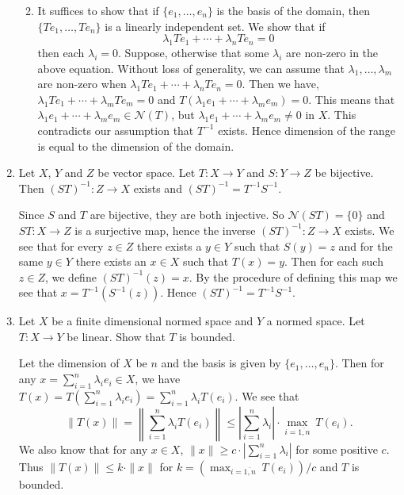 \documentclass[12pt]{article}
\newcommand{\cN}{\mathcal{N}}
\begin{document}
\begin{enumerate}
\begin{mybox}
\begin{enumerate}
        \vspace*{3mm}
        \item It suffices to show that if $\{e_1,\ldots
        ,e_n\}$ is the basis of the domain, then $\{Te_1,
        \ldots, Te_n\}$ is a linearly independent set.
        We show that if
        $$\lambda_1Te_1+\cdots+\lambda_nTe_n=0$$
        then each $\lambda_i=0$. Suppose, otherwise that
        some $\lambda_i$ are non-zero in the above equation.
        Without loss of generality, we can assume that
        $\lambda_1,\ldots,\lambda_m$ are non-zero
        when $\lambda_1Te_1+\cdots+\lambda_nTe_n=0$.
        Then we have, $\lambda_1Te_1+\cdots+\lambda_mTe_m=0$
        and $T(\lambda_1e_1+\cdots+\lambda_me_m)=0$.
        This means that $\lambda_1e_1+\cdots+\lambda_me_m
        \in \cN(T)$, but $\lambda_1e_1+\cdots+\lambda_me_m
        \neq 0$ in $X$. This contradicts our assumption that
        $T^{-1}$ exists. Hence dimension of the range is
        equal to the dimension of the domain.
    \end{enumerate}
\end{mybox}


\item Let $X$, $Y$ and $Z$ be vector space.
    Let $T: X \to Y$ and
    $S: Y \to Z$ be bijective. Then $(ST)^{-1}: Z \to X $
    exists and $(ST)^{-1} = T^{-1} S^{-1}$. 
\begin{mybox}

    Since $S$ and $T$ are bijective, they are both injective.
    So $\cN(ST)=\{0\}$ and $ST:X\to Z$ is a surjective map,
    hence the inverse $(ST)^{-1}:Z\to X$ exists.
    We see that for every
    $z\in Z$ there exists a $y\in Y$ such that $S(y)=z$
    and for the same $y\in Y$ there exists an $x\in X$
    such that $T(x)=y$. Then for each such $z\in Z$,
    we define $(ST)^{-1}(z)=x$. By the procedure of
    defining this map we see that $x=T^{-1}(S^{-1}(z))$.
    Hence $(ST)^{-1}=T^{-1}S^{-1}$.
\end{mybox}
 
 
\item Let $X$ be a finite dimensional normed space and
    $Y$ a normed space.
    Let $T: X \to Y$ be linear. Show that $T$ is bounded. 
\begin{mybox}

    Let the dimension of $X$ be $n$ and the basis is
    given by $\{e_1,\ldots,e_n\}$. Then for any $x=
    \sum_{i=1}^n{\lambda_ie_i}\in X$,
    we have $T(x)=T\left(\sum_{i=1}^n{\lambda_ie_i}\right)
    =\sum_{i=1}^n{\lambda_iT(e_i)}.$ We see that
    $$\left\|T(x)\right\|=\left\|\sum_{i=1}^n{\lambda_iT(e_i)}
    \right\|\leq \left|\sum_{i=1}^n{\lambda_i}\right|\cdot
    \max_{i=\overline{1,n}}\ T(e_i).$$
    We also know that for any $x\in X$, $\|x\|\geq c
    \cdot \left|\sum_{i=1}^n{\lambda_i}\right|$ for some
    positive $c$. Thus $\|T(x)\|\leq k\cdot\|x\|$ for
    $k=(\max_{i=\overline{1,n}}\ T(e_i))/c$ and $T$ is
    bounded.
\end{mybox}


\end{enumerate}
\end{document}
